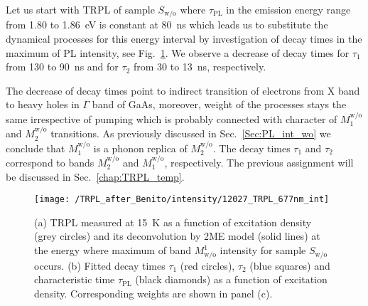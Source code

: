 Let us start with TRPL of sample $S_\mathrm{w/o}$ where $\tau_\mathrm{PL}$ in the emission energy range from 1.80 to 1.86~eV is constant at 80~ns which leads us to substitute the dynamical processes for this energy interval by investigation of decay times in the maximum of PL intensity, see Fig.~\ref{fig:TRPL_int_wo}. We observe a decrease of decay times for $\tau_1$ from 130 to 90~ns and for $\tau_2$ from 30 to 13~ns, respectively.

The decrease of decay times point to indirect transition of electrons from X band to heavy holes in $\Gamma$ band of GaAs, moreover, weight of the processes stays the same irrespective of pumping which is probably connected with character of $M_1^\mathrm{w/o}$ and $M_2^\mathrm{w/o}$ transitions. As previously discussed in Sec.~\ref{Sec:PL_int_wo} we conclude that $M_1^\mathrm{w/o}$ is a phonon replica of $M_2^\mathrm{w/o}$. The decay times $\tau_1$ and $\tau_2$ correspond to bands $M_2^\mathrm{w/o}$ and $M_1^\mathrm{w/o}$, respectively. The previous assignment will be discussed in Sec.~\ref{chap:TRPL_temp}.


%

\begin{figure}
	\centering
	\texttt{[image: /TRPL\_after\_Benito/intensity/12027\_TRPL\_677nm\_int]}
	\caption{(a) TRPL measured at 15~K as a function of excitation density (grey circles) and its deconvolution by 2ME model (solid lines) at the energy where maximum of band $M^1_\mathrm{w/o}$ intensity for sample $S_\mathrm{w/o}$ occurs. (b) Fitted decay times $\tau_1$ (red circles), $\tau_2$ (blue squares) and characteristic time $\tau_\mathrm{PL}$ (black diamonds) as a function of excitation density. Corresponding weights are shown in panel (c).}
	\label{fig:TRPL_int_wo}
\end{figure}

